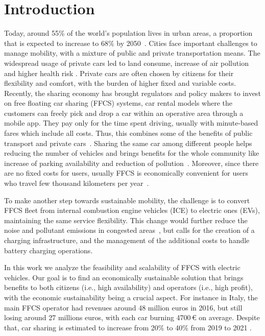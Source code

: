 \section{Introduction}
\label{sec:10_1_intro}

Today, around 55\% of the world’s population lives in urban areas, a proportion that is expected to increase to 68\% by 2050~\cite{UNfuture}.
Cities face important challenges to manage mobility, with a mixture of public and private transportation means. 
The widespread usage of private cars led to land consume, increase of air pollution and higher health risk \cite{3_kent2014carsharing}.
Private cars are often chosen by citizens for their flexibility and comfort, with the burden of higher fixed %
and variable costs. %
Recently, the sharing economy has brought regulators and policy makers to invest on free floating car sharing (FFCS) systems, car rental models where the customers can freely pick and drop a car within an operative area through a mobile app. They pay only for the time spent driving, usually with minute-based fares which include all costs. Thus, this combines some of the benefits of public transport and private cars~\cite{2_huwer2004public}. 
Sharing the same car among different people helps reducing the number of vehicles and brings benefits for the whole community like increase of parking availability and reduction of pollution~\cite{12_martin2011greenhouse}.  
Moreover, since there are no fixed costs for users, usually FFCS is economically convenient for users who travel few thousand kilometers per year~\cite{1_litman2000evaluating}. 


To make another step towards sustainable mobility, the challenge is to convert FFCS fleet from internal combustion engine vehicles (ICE) to electric ones (EVs), maintaining the same service flexibility. This change would further reduce the noise and pollutant emissions in congested areas~\cite{25_ev_benefits}, but calls for the creation of a charging infrastructure, and the management of the additional costs to handle battery charging operations.

In this work we analyze the feasibility and scalability of FFCS with electric vehicles.
Our goal is to find an economically sustainable solution that brings benefits to both citizens (i.e., high availability) and operators (i.e., high profit), with the economic sustainability being a crucial aspect. For instance in Italy, the main FFCS operator had revenues around 48 million euros in 2016, but still losing around 27 millions euros, with each car burning 4700\,€ on average\cite{Quattroruote}.
Despite that, car sharing is estimated to increase from 20\% to 40\% from 2019 to 2021 \cite{soleCarSharing}. %

